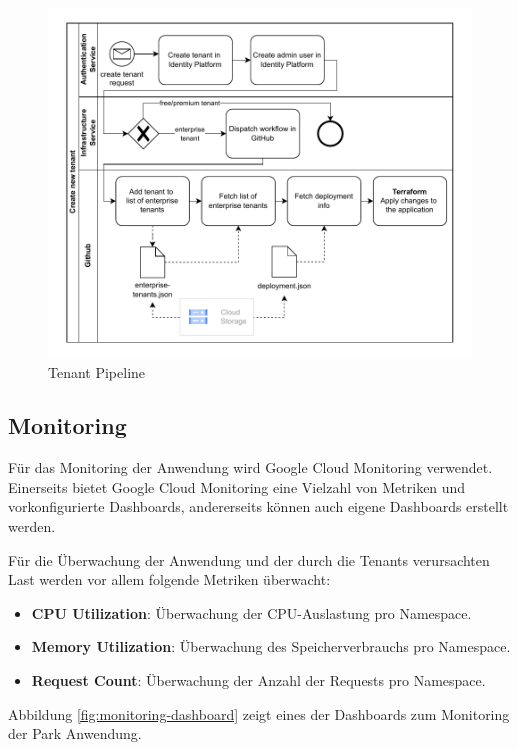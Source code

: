 \begin{figure}[H]
  \centering
  \includegraphics[width=\textwidth]{resources/tenant-pipeline.pdf}
  \caption{Tenant Pipeline}
  \label{fig:tenant-pipeline}
\end{figure}

\subsection{Monitoring}

Für das Monitoring der Anwendung wird Google Cloud Monitoring verwendet.
Einerseits bietet Google Cloud Monitoring eine Vielzahl von Metriken und vorkonfigurierte Dashboards,
andererseits können auch eigene Dashboards erstellt werden.

Für die Überwachung der Anwendung und der durch die Tenants verursachten Last werden 
vor allem folgende Metriken überwacht:

\begin{itemize}
  \item \textbf{CPU Utilization}: Überwachung der CPU-Auslastung pro Namespace.
  \item \textbf{Memory Utilization}: Überwachung des Speicherverbrauchs pro Namespace.
  \item \textbf{Request Count}: Überwachung der Anzahl der Requests pro Namespace.
\end{itemize}

Abbildung \ref{fig:monitoring-dashboard} zeigt eines der Dashboards zum Monitoring der Park Anwendung.

